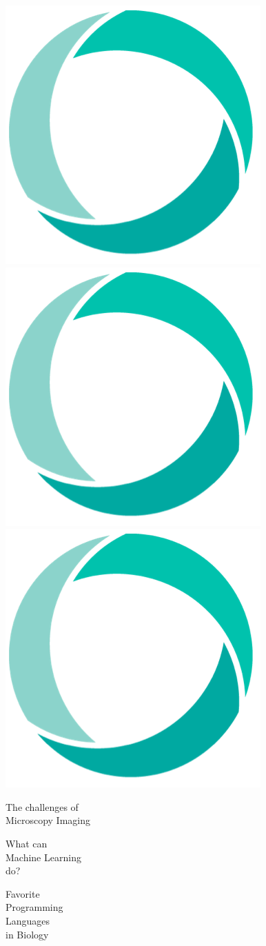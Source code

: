 \documentclass[a4paper,landscape]{article}
\begin{document}
    \begin{center}
        \includegraphics[width=.15\textwidth,right]{img/wcc-logo.png} \\
        \vspace{1.5cm}
        \includegraphics[width=.15\textwidth,right]{img/wcc-logo.png} \\
        \vspace{1.5cm}
        \includegraphics[width=.15\textwidth,right]{img/wcc-logo.png}
    \end{center}

    \clearpage

    \vspace{5cm}
    \begin{center}
        \hspace{-5cm}
        {\fontsize{70}{100}\selectfont The challenges of }\\
        {\fontsize{100}{100}\selectfont Microscopy Imaging}\\
    \end{center}

    \clearpage

    \begin{center}
        \hspace{-5cm}
        {\fontsize{70}{100}\selectfont What can }\\
        {\fontsize{100}{100}\selectfont Machine Learning}\\
        {\fontsize{70}{100}\selectfont do? }
    \end{center}

    \clearpage

    \begin{center}
        \hspace{-5cm}
        {\fontsize{70}{100}\selectfont Favorite }\\
        {\fontsize{100}{100}\selectfont Programming }\\
        {\fontsize{100}{100}\selectfont Languages }\\
        {\fontsize{70}{100}\selectfont in Biology }
    \end{center}
\end{document}
